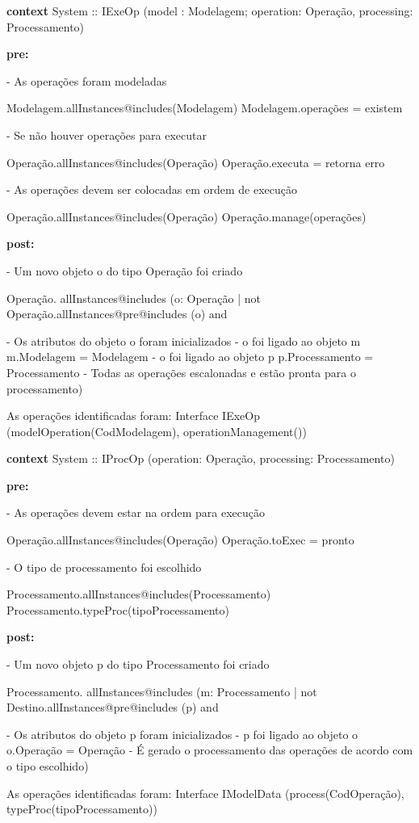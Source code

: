 \begin{minipage}[t][][b]{0.9\textwidth}
	\ttfamily
\hrulefill

\textbf{context} System :: IExeOp (model : Modelagem; operation: Operação, processing: Processamento)


\textbf{pre:}

- As operações foram modeladas

Modelagem.allInstances@includes(Modelagem) Modelagem.operações = existem 

- Se não houver operações para executar

Operação.allInstances@includes(Operação) Operação.executa = retorna  erro

- As operações devem ser colocadas em ordem de execução

Operação.allInstances@includes(Operação) Operação.manage(operações)

\textbf{post:}

- Um novo objeto o do tipo Operação foi criado

Operação. allInstances@includes (o: Operação | not Operação.allInstances@pre@includes (o) and

- Os atributos do objeto o foram inicializados
- o foi ligado ao objeto m
m.Modelagem = Modelagem
- o foi ligado ao objeto p
p.Processamento = Processamento
- Todas as operações escalonadas e estão pronta para o processamento)

\hrulefill

As operações identificadas foram:
Interface IExeOp (modelOperation(CodModelagem), operationManagement())

\end{minipage}


\begin{minipage}[t][][b]{0.9\textwidth}
	\ttfamily
	\hrulefill
	
	\textbf{context} System :: IProcOp (operation: Operação, processing: Processamento)
	
	
	\textbf{pre:}
	
	- As operações devem estar na ordem para execução
	
	Operação.allInstances@includes(Operação) Operação.toExec = pronto
	
	- O tipo de processamento foi escolhido
	
	Processamento.allInstances@includes(Processamento) Processamento.typeProc(tipoProcessamento)
		
	\textbf{post:}
	
	- Um novo objeto p do tipo Processamento foi criado
	
	Processamento. allInstances@includes (m: Processamento | not Destino.allInstances@pre@includes (p) and
	
	- Os atributos do objeto p foram inicializados
	- p foi ligado ao objeto o
	o.Operação = Operação
	- É gerado o processamento das operações de acordo com o tipo escolhido)
	
	\hrulefill
	
	As operações identificadas foram:
	Interface IModelData (process(CodOperação), typeProc(tipoProcessamento))
	
\end{minipage}

